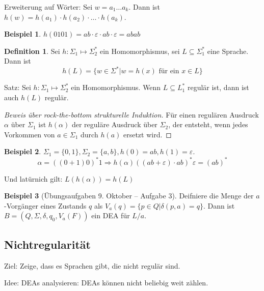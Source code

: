 \documentclass[11pt]{article} %
\theoremstyle{definition}
\newtheorem*{beispiel}{Beispiel}
\newtheorem{definition}{Definition}
\begin{document}
\begin{description}
Erweiterung auf Wörter: Sei $w = a_1\dots a_k$. Dann ist $h(w) = h(a_1)\cdot h(a_2)\cdot \dots \cdot h(a_k)$.

\begin{beispiel}
$h(0101) = ab\cdot \varepsilon \cdot ab \cdot \varepsilon = abab$
\end{beispiel}

\begin{definition}
Sei $h : \Sigma_1 \mapsto \Sigma_2^*$ ein Homomorphismus, sei $L \subseteq \Sigma_1^*$ eine Sprache. Dann ist
\[
h(L) = \{ w \in \Sigma^* | w = h(x) \textrm{ für ein } x \in L \}
\]
\end{definition}

Satz: Sei $h : \Sigma_1 \mapsto \Sigma_2^*$ ein Homomorphismus. Wenn $L \subseteq L_1^*$ regulär ist, dann ist auch $h(L)$ regulär.

\begin{proof}[Beweis über rock-the-bottom strukturelle Induktion]
Für einen regulären Ausdruck $\alpha$ über $\Sigma_1$ ist $h(\alpha)$ der reguläre Ausdruck über $\Sigma_2$, der entsteht, wenn jedes Vorkommen von $a \in \Sigma_1$ durch $h(a)$ ersetzt wird. 
\end{proof}

\begin{beispiel}
$\Sigma_1 = \{0,1\}, \Sigma_2 = \{a,b\}, h(0) = ab, h(1) = \varepsilon$.
\[
\alpha = ((0+1)0)^* 1 \Rightarrow h(\alpha) ((ab + \varepsilon)\cdot ab)^*\varepsilon = (ab)^*
\]
\end{beispiel}

Und latürnich gilt: $L(h(\alpha)) = h(L)$

\begin{beispiel}[Übungsaufgaben 9. Oktober -- Aufgabe 3]
Deifniere die Menge der $a$-Vorgänger eines Zustands $q$ als $V_a(q) = \{ p \in Q | \delta(p, a) = q \}$. Dann ist $B = (Q, \Sigma, \delta, q_0, V_a(F))$ ein DEA für $L/a$.
\end{beispiel}

\end{description}

\subsection{Nichtregularität}

Ziel: Zeige, dass es Sprachen gibt, die nicht regulär sind.

Idee: DEAs analysieren: DEAs können nicht beliebig weit zählen.
\end{document}

